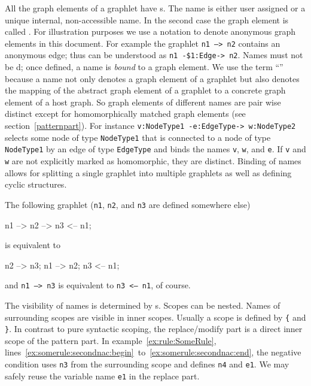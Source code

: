 All the graph elements of a graphlet have s.
The name is either user assigned or a unique internal, non-accessible name.
In the second case the graph element is called .
For illustration purposes we use a  notation to denote anonymous graph elements in this document.
For example the graphlet \texttt{n1 --> n2} contains an anonymous edge; thus can be understood as \texttt{n1 -\$1:Edge-> n2}.
Names must not be d; once defined, a name is \emph{bound} to a graph element. 
We use the term ``'' because a name not only denotes a graph element of a graphlet but also denotes the mapping of the abstract graph element of a graphlet to a concrete graph element of a host graph.
So graph elements of different names are pair wise distinct except for homomorphically matched graph elements (see section~\ref{patternpart}).
For instance \texttt{v:NodeType1 -e:EdgeType-> w:NodeType2} selects some node of type \texttt{Node\-Type1} that is connected to a node of type \texttt{NodeType1} by an edge of type \texttt{EdgeType} and binds the names \texttt{v}, \texttt{w}, and \texttt{e}. 
If \texttt{v} and \texttt{w} are not explicitly marked as homomorphic, they are distinct.
Binding of names allows for splitting a single graphlet into multiple graphlets as well as defining cyclic structures.
\begin{example}
The following graphlet (\texttt{n1}, \texttt{n2}, and \texttt{n3} are defined somewhere else)
\begin{grgen}
n1 --> n2 --> n3 <-- n1;
\end{grgen}
is equivalent to
\begin{grgen}
n2 --> n3;
n1 --> n2;
n3 <-- n1;
\end{grgen}
and \texttt{n1 --> n3} is equivalent to \texttt{n3 <-- n1}, of course.
\end{example}
The visibility of names is determined by s. 
Scopes can be nested. 
Names of surrounding scopes are visible in inner scopes. 
Usually a scope is defined by \texttt{\{} and \texttt{\}}.
In contrast to pure syntactic scoping, the replace/modify part is a direct inner scope of the pattern part.
In example~\ref{ex:rule:SomeRule}, lines~\ref{ex:somerule:secondnac:begin}~to~\ref{ex:somerule:secondnac:end}, the negative condition uses \texttt{n3} from the surrounding scope and defines \texttt{n4} and \texttt{e1}. 
We may safely reuse the variable name \texttt{e1} in the replace part.

